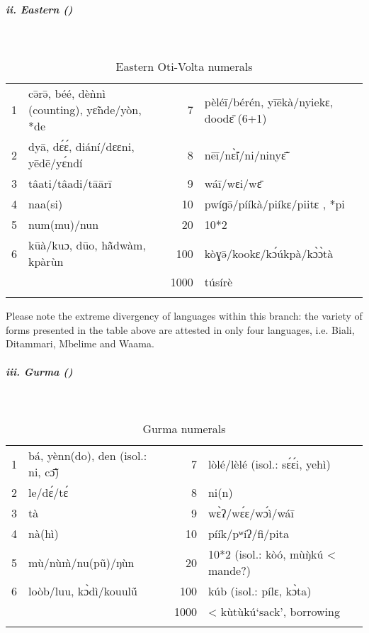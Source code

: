   
\subparagraph{ii. Eastern ()}
~
\begin{table}
\caption{\label{tab:3:167}Eastern Oti-Volta numerals}


\begin{tabularx}{\textwidth}{lQrQ}
\lsptoprule

{1} & c{\={ə}}r{\={ə}}, béé, dè{\`{n}}nì (counting), y{\~{ɛ}}nde/yòn, *de & {7} & pèléī/bérén, yīēkà/nyiekɛ, dood{\={ɛ}} (6+1)\\
{2} & dyā, d{\'{ɛ}}{\'{ɛ}}, diání/dɛɛni, yēdē/y{\'{ɛ}}ndí & {8} & nēī/n{\`{\~ɛ}}í/ni/niny{\={\~{ɛ}}}\\
{3} & tâati/tâadi/tāārī & {9} & wáī/wɛi/w{\={ɛ}}\\
{4} & naa(si) & {10} & pwíɡ{\={ə}}/pííkà/piíkɛ/piitɛ , *pi\\
{5} & num(mu)/nun & {20} & 10*2\\
{6} & kūà/kuɔ, dūo, h{\`ã}dwàm, kpàrùn & {100} & kòɣ{\={ə}}/kookɛ/k{\'{ɔ}}úkpà/k{\`{ɔ}}{\`{ɔ}}tà\\
&  & {1000} & túsírè\\
\lspbottomrule
\end{tabularx}
\end{table}

Please note the extreme divergency of languages within this branch: the variety of forms presented in the table above are attested in only four languages, i.e. Biali, Ditammari, Mbelime and Waama.


\subparagraph{iii. Gurma ()}
~
\begin{table}
\caption{\label{tab:3:168}Gurma numerals}


\begin{tabularx}{\textwidth}{lXrl}
\lsptoprule
{1} & bá, yènn(do), den (isol.: ni, c{\={\~{ɔ}}}) & {7} & lòlé/lèlé (isol.: s{\'{ɛ}}{\'{ɛ}}i, yehì)\\
{2} & le/d{\'{ɛ}}/t{\'{ɛ}} & {8} & ni(n)\\
{3} & tà & {9} & w{\`{ɛ}}ʔ/w{\'{ɛ}}ɛ/w{\'{ɔ}}ì/wáī\\
{4} & nà(hì) & {10} & píík/pʷíʔ/fi/pita\\
{5} & mù/nù{\`{m}}/nu(p{\~{u}})/ŋùn & {20} & 10*2 (isol.: kòó, mù{\`{ŋ}}kú < mande?)\\
{6} & loòb/luu, k{\`{ɔ}}dì/kouul{\'ũ} & {100} & kúb (isol.: pílɛ, k{\`{ɔ}}ta)\\
&  & {1000} & < kùtùkú‘sack', borrowing\\
\lspbottomrule
\end{tabularx}
\end{table}

